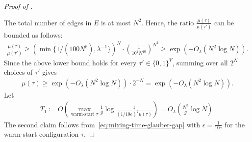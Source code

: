 \documentclass[10pt,a4paper]{amsart}
\newcommand{\defeq}{:=}
\newcommand{\tp}[1]{{\left( #1 \right)}}
\begin{document}
\begin{proof}[Proof of ]
\begin{itemize}
\end{itemize}
The total number of edges in $E$ is at most $N^2$. Hence, the ratio $\frac{\mu(\tau)}{\mu(\tau')}$ can be bounded as follows:
\begin{align*}
\frac{\mu(\tau)}{\mu(\tau')} \geq \tp{\min\{1/(100N^5),\lambda^{-1}\}}^{N} \cdot \tp{\frac{1}{10^4 N^{10}}}^{N^2} \geq \exp(-O_\lambda(N^2 \log N)).
\end{align*}
Since the above lower bound holds for every $\tau' \in \{0,1\}^V$, summing over all $2^N$ choices of $\tau'$ gives
\begin{align}\label{eq:mu-tau-lower-bound}
 \mu(\tau) \geq \exp(-O_\lambda(N^2 \log N)) \cdot 2^{-N} = \exp(-O_\lambda(N^2 \log N)).
\end{align}
Let
\begin{align*}
 T_1 \defeq O\left( \max_{\text{warm-start } \tau} \frac{1}{g} \log \frac{1}{(1/10e)^2 \mu(\tau)}\right) = O_\lambda\tp{\frac{N^2}{g} \log N}.
\end{align*}
The second claim follows from~\eqref{eq:mixing-time-glauber-gap} with $\epsilon = \frac{1}{10e}$ for the warm-start configuration $\tau$.
\end{proof}
\end{document}
